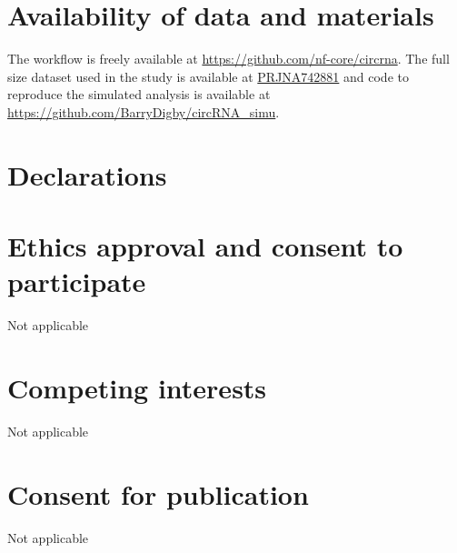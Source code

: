 \documentclass{bmcart}
\begin{document}
\begin{backmatter}
\section*{Availability of data and materials}%
The workflow is freely available at \href{https://github.com/nf-core/circrna}{https://github.com/nf-core/circrna}. The full size dataset used in the study is available at \href{https://www.omicsdi.org/dataset/omics_ena_project/PRJNA742881}{PRJNA742881} and code to reproduce the simulated analysis is available at \href{https://github.com/BarryDigby/circRNA_simu}{https://github.com/BarryDigby/circRNA\_simu}. 

\section*{Declarations}

\section*{Ethics approval and consent to participate}%
Not applicable

\section*{Competing interests}
Not applicable

\section*{Consent for publication}%
Not applicable





\end{backmatter}
\end{document}
